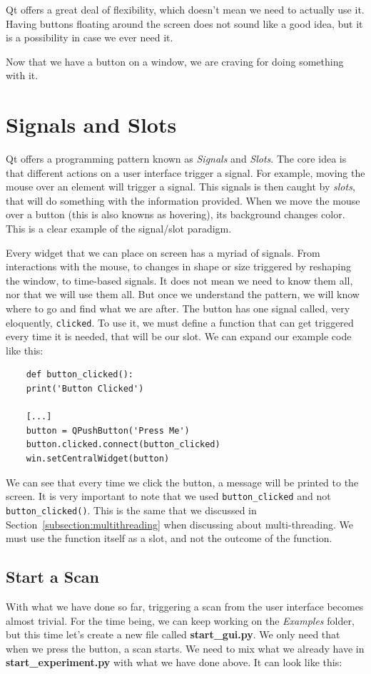 Qt offers a great deal of flexibility, which doesn't mean we need to actually use it. Having buttons floating around the screen does not sound like a good idea, but it is a possibility in case we ever need it.

Now that we have a button on a window, we are craving for doing something with it.


\section{Signals and Slots}\label{section:signals-slots}
Qt offers a programming pattern known as \emph{Signals} and \emph{Slots}. The core idea is that different actions on a user interface trigger a signal. For example, moving the mouse over an element will trigger a signal. This signals is then caught by \emph{slots}, that will do something with the information provided. When we move the mouse over a button (this is also knowns as hovering), its background changes color. This is a clear example of the signal/slot paradigm.

Every widget that we can place on screen has a myriad of signals. From interactions with the mouse, to changes in shape or size triggered by reshaping the window, to time-based signals. It does not mean we need to know them all, nor that we will use them all. But once we understand the pattern, we will know where to go and find what we are after. The button has one signal called, very eloquently, \texttt{clicked}. To use it, we must define a function that can get triggered every time it is needed, that will be our slot. We can expand our example code like this:

\begin{verbatim}
    def button_clicked():
    print('Button Clicked')

    [...]
    button = QPushButton('Press Me')
    button.clicked.connect(button_clicked)
    win.setCentralWidget(button)
\end{verbatim}

We can see that every time we click the button, a message will be printed to the screen. It is very important to note that we used \texttt{button\_clicked} and not \texttt{button\_clicked()}. This is the same that we discussed in Section~\ref{subsection:multithreading} when discussing about multi-threading. We must use the function itself as a slot, and not the outcome of the function.

\subsection{Start a Scan}\label{subsection:start-scan-gui}
With what we have done so far, triggering a scan from the user interface becomes almost trivial. For the time being, we can keep working on the \emph{Examples} folder, but this time let's create a new file called \textbf{start\_gui.py}. We only need that when we press the button, a scan starts. We need to mix what we already have in \textbf{start\_experiment.py} with what we have done above. It can look like this:

